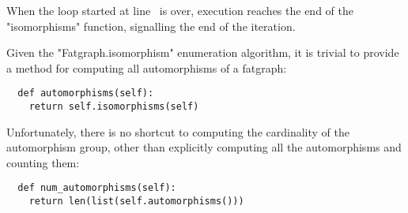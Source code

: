 When the loop started at line~ is over, execution
reaches the end of the "isomorphisms" function, signalling the end of
the iteration.

Given the "Fatgraph.isomorphism" enumeration algorithm, it is trivial
to provide a method for computing all automorphisms of a fatgraph:
\begin{lstlisting}
  def automorphisms(self):
    return self.isomorphisms(self)

\end{lstlisting}
Unfortunately, there is no shortcut to computing the cardinality of
the automorphism group, other than explicitly computing all the
automorphisms and counting them:
\begin{lstlisting}
  def num_automorphisms(self):
    return len(list(self.automorphisms()))

\end{lstlisting}

